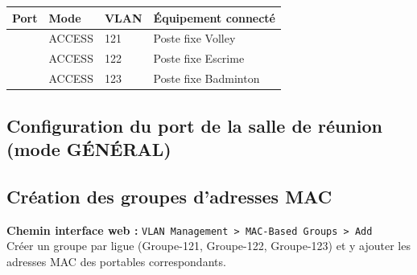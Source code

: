 \documentclass[a4paper,12pt]{article}
\begin{document}
\begin{tabularx}{\textwidth}{C{3cm} C{3cm} C{3cm} X}
  \toprule
  \textbf{Port} & \textbf{Mode} & \textbf{VLAN} & \textbf{Équipement connecté} \\
  \midrule
   & ACCESS & 121 & Poste fixe Volley \\
   & ACCESS & 122 & Poste fixe Escrime \\
   & ACCESS & 123 & Poste fixe Badminton \\
  \bottomrule
\end{tabularx}

\subsection{Configuration du port de la salle de réunion (mode GÉNÉRAL)}


\begin{tcolorbox}[colback=black!90, coltext=green!70!white, fontupper=\ttfamily\small,
  title={\color{white}\small Port salle de réunion — mode GÉNÉRAL (CLI)}, colbacktitle=primary]
\end{tcolorbox}

\subsection{Création des groupes d'adresses MAC}


\begin{infobox}
  \textbf{Chemin interface web :} \texttt{VLAN Management > MAC-Based Groups > Add}\\
  Créer un groupe par ligue (Groupe-121, Groupe-122, Groupe-123) et y ajouter
  les adresses MAC des portables correspondants.
\end{infobox}

\begin{tcolorbox}[colback=black!90, coltext=green!70!white, fontupper=\ttfamily\small,
  title={\color{white}\small Groupes MAC (CLI)}, colbacktitle=primary]
\end{tcolorbox}
\end{document}
